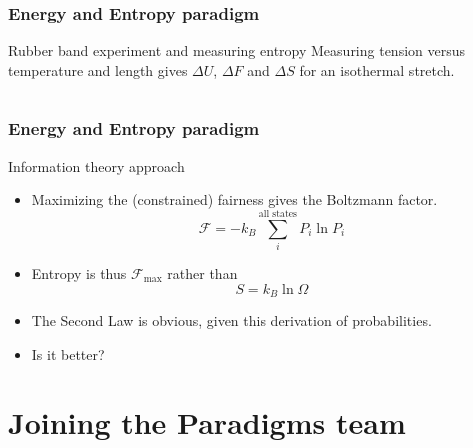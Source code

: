 \documentclass{beamer}
\begin{document}
\begin{frame}
  \frametitle{Energy and Entropy paradigm}
  \begin{block}{Rubber band experiment and measuring entropy}
    Measuring tension versus temperature and length gives $\Delta U$,
    $\Delta F$ and $\Delta S$ for an isothermal stretch.

    \begin{columns}
      \begin{column}{2.4in}
        \begin{center}
        \end{center}
      \end{column}
      \begin{column}{2in}
        \begin{center}
        \end{center}
      \end{column}
    \end{columns}
  \end{block}
\end{frame}

\newcommand\fairness{\ensuremath{\mathcal{F}}}

\begin{frame}
  \frametitle{Energy and Entropy paradigm}
  \begin{block}{Information theory approach}
    \begin{itemize}
    \item Maximizing the (constrained) fairness gives the Boltzmann
      factor.
      \[
      \fairness = -k_B\sum_i^\text{all states} P_i \ln P_i
      \]
    \item Entropy is thus $\fairness_\text{max}$ rather than
      \[
      S = k_B \ln \Omega
      \]
    \item The Second Law is obvious, given this derivation of
      probabilities.
    \item Is it better?
    \end{itemize}
  \end{block}
\end{frame}


\section{Joining the Paradigms team}
\subsection*{}
\end{document}
